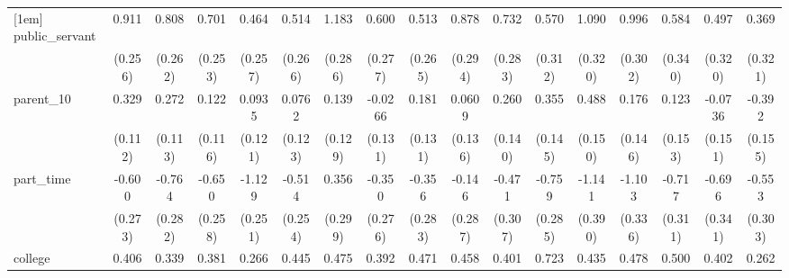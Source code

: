{\begin{tabular}{l*{16}{c}}
[1em]
public\_servant      &       0.911\sym{***}&       0.808\sym{**} &       0.701\sym{**} &       0.464         &       0.514         &       1.183\sym{***}&       0.600\sym{*}  &       0.513         &       0.878\sym{**} &       0.732\sym{**} &       0.570         &       1.090\sym{***}&       0.996\sym{***}&       0.584         &       0.497         &       0.369         \\
                    &     (0.256)         &     (0.262)         &     (0.253)         &     (0.257)         &     (0.266)         &     (0.286)         &     (0.277)         &     (0.265)         &     (0.294)         &     (0.283)         &     (0.312)         &     (0.320)         &     (0.302)         &     (0.340)         &     (0.320)         &     (0.321)         \\
[1em]
parent\_10           &       0.329\sym{**} &       0.272\sym{*}  &       0.122         &      0.0935         &      0.0762         &       0.139         &     -0.0266         &       0.181         &      0.0609         &       0.260         &       0.355\sym{*}  &       0.488\sym{**} &       0.176         &       0.123         &     -0.0736         &      -0.392\sym{*}  \\
                    &     (0.112)         &     (0.113)         &     (0.116)         &     (0.121)         &     (0.123)         &     (0.129)         &     (0.131)         &     (0.131)         &     (0.136)         &     (0.140)         &     (0.145)         &     (0.150)         &     (0.146)         &     (0.153)         &     (0.151)         &     (0.155)         \\
[1em]
part\_time           &      -0.600\sym{*}  &      -0.764\sym{**} &      -0.650\sym{*}  &      -1.129\sym{***}&      -0.514\sym{*}  &       0.356         &      -0.350         &      -0.356         &      -0.146         &      -0.471         &      -0.759\sym{**} &      -1.141\sym{**} &      -1.103\sym{**} &      -0.717\sym{*}  &      -0.696\sym{*}  &      -0.553         \\
                    &     (0.273)         &     (0.282)         &     (0.258)         &     (0.251)         &     (0.254)         &     (0.299)         &     (0.276)         &     (0.283)         &     (0.287)         &     (0.307)         &     (0.285)         &     (0.390)         &     (0.336)         &     (0.311)         &     (0.341)         &     (0.303)         \\
[1em]
college             &       0.406\sym{**} &       0.339\sym{*}  &       0.381\sym{**} &       0.266         &       0.445\sym{**} &       0.475\sym{**} &       0.392\sym{**} &       0.471\sym{**} &       0.458\sym{**} &       0.401\sym{*}  &       0.723\sym{***}&       0.435\sym{*}  &       0.478\sym{**} &       0.500\sym{**} &       0.402\sym{*}  &       0.262         \\

\end{tabular}}
